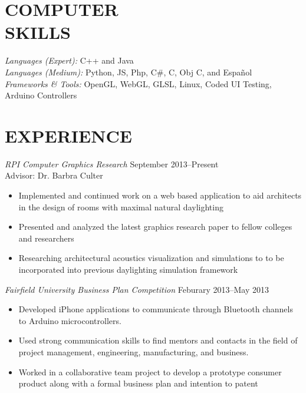 \documentclass[margin, 10pt]{res}
\begin{document}
\begin{resume}
\section{COMPUTER \\ SKILLS} 

{\sl Languages (Expert):}  C++ and Java \\
{\sl Languages (Medium):} Python, JS, Php, C#, C, Obj C, and Espa\~nol  \\
{\sl Frameworks \& Tools:} OpenGL, WebGL, GLSL, Linux, Coded UI Testing, Arduino Controllers
 
%
%  
 
\section{EXPERIENCE}

{\sl RPI Computer Graphics Research} \hfill September 2013--Present\\
Advisor: Dr. Barbra Culter
\begin{itemize} \itemsep -2.5pt %
\item Implemented and continued work on a web based application to aid 
      architects in the design of rooms with maximal natural daylighting
\item Presented and analyzed the latest graphics research paper to fellow 
      colleges and researchers
\item Researching architectural acoustics visualization and simulations to
      to be incorporated into previous daylighting simulation framework
\end{itemize}
 
{\sl Fairfield University Business Plan Competition} 
                                              \hfill Feburary 2013--May 2013
\begin{itemize} \itemsep -2.5pt %
\item Developed iPhone applications to communicate through Bluetooth 
      channels to Arduino microcontrollers.
\item Used strong communication skills to find mentors and contacts in the 
      field of project management, engineering, manufacturing, and business.
\item Worked in a collaborative team project to develop a prototype consumer
      product along with a formal business plan and intention to patent
\end{itemize}
 

\end{resume}
\end{document}
